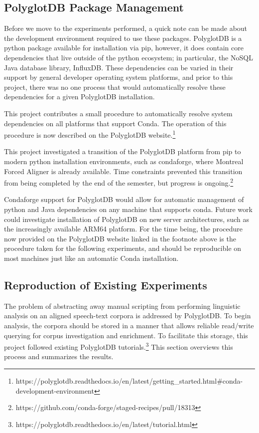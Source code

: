 \documentclass[11pt]{article}
\begin{document}
\subsection{PolyglotDB Package Management}

Before we move to the experiments performed, a quick note can be made about the development environment required to use these packages. PolyglotDB is a python package available for installation via pip, however, it does contain core dependencies that live outside of the python ecosystem; in particular, the NoSQL Java database library, InfluxDB. These dependencies can be varied in their support by general developer operating system platforms, and prior to this project, there was no one process that would automatically resolve these dependencies for a given PolyglotDB installation.

This project contributes a small procedure to automatically resolve system dependencies on all platforms that support Conda. The operation of this procedure is now described on the PolyglotDB website.\footnote{https://polyglotdb.readthedocs.io/en/latest/getting\_started.html\#conda-development-environment}

This project investigated a transition of the PolyglotDB platform from pip to modern python installation environments, such as condaforge\cite{conda_forge_community_2015_4774216}, where Montreal Forced Aligner is already available. Time constraints prevented this transition from being completed by the end of the semester, but progress is ongoing.\footnote{https://github.com/conda-forge/staged-recipes/pull/18313}

Condaforge support for PolyglotDB would allow for automatic management of python and Java dependencies on any machine that supports conda. Future work could investigate installation of PolyglotDB on new server architectures, such as the increasingly available ARM64 platform. For the time being, the procedure now provided on the PolyglotDB website linked in the footnote above is the procedure taken for the following experiments, and should be reproducible on most machines just like an automatic Conda installation. 

\subsection{Reproduction of Existing Experiments}

The problem of abstracting away manual scripting from performing linguistic analysis on an aligned speech-text corpora is addressed by PolyglotDB. To begin analysis, the corpora should be stored in a manner that allows reliable read/write querying for corpus investigation and enrichment. To facilitate this storage, this project followed existing PolyglotDB tutorials.\footnote{https://polyglotdb.readthedocs.io/en/latest/tutorial.html} This section overviews this process and summarizes the results.
\end{document}
